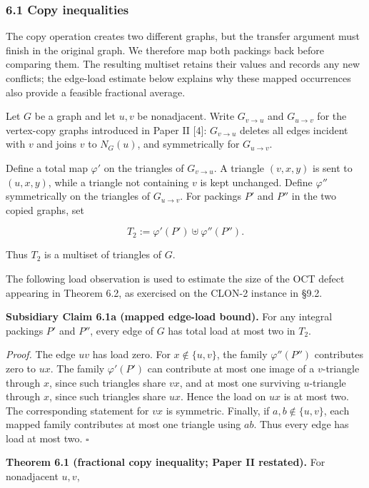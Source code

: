 \documentclass[english,11pt,a4paper]{article}
\begin{document}
\subsubsection{6.1 Copy inequalities}\label{copy-inequalities}

The copy operation creates two different graphs, but the transfer
argument must finish in the original graph. We therefore map both
packings back before comparing them. The resulting multiset retains
their values and records any new conflicts; the edge-load estimate below
explains why these mapped occurrences also provide a feasible fractional
average.

Let \(G\) be a graph and let \(u,v\) be nonadjacent. Write
\(G_{v\to u}\) and \(G_{u\to v}\) for the vertex-copy graphs introduced
in Paper II {[}4{]}: \(G_{v\to u}\) deletes all edges incident with
\(v\) and joins \(v\) to \(N_G(u)\), and symmetrically for
\(G_{u\to v}\).

Define a total map \(\varphi'\) on the triangles of \(G_{v\to u}\). A
triangle \((v,x,y)\) is sent to \((u,x,y)\), while a triangle not
containing \(v\) is kept unchanged. Define \(\varphi''\) symmetrically
on the triangles of \(G_{u\to v}\). For packings \(P'\) and \(P''\) in
the two copied graphs, set

\[
T_2:=\varphi'(P')\uplus\varphi''(P'').
\]

Thus \(T_2\) is a multiset of triangles of \(G\).

The following load observation is used to estimate the size of the OCT
defect appearing in Theorem 6.2, as exercised on the CLON-2 instance in
§9.2.

\textbf{Subsidiary Claim 6.1a (mapped edge-load bound).} For any
integral packings \(P'\) and \(P''\), every edge of \(G\) has total load
at most two in \(T_2\).

\emph{Proof.} The edge \(uv\) has load zero. For \(x\notin\{u,v\}\), the
family \(\varphi''(P'')\) contributes zero to \(ux\). The family
\(\varphi'(P')\) can contribute at most one image of a \(v\)-triangle
through \(x\), since such triangles share \(vx\), and at most one
surviving \(u\)-triangle through \(x\), since such triangles share
\(ux\). Hence the load on \(ux\) is at most two. The corresponding
statement for \(vx\) is symmetric. Finally, if \(a,b\notin\{u,v\}\),
each mapped family contributes at most one triangle using \(ab\). Thus
every edge has load at most two. \(\square\)

\textbf{Theorem 6.1 (fractional copy inequality; Paper II restated).}
For nonadjacent \(u,v\),
\end{document}
